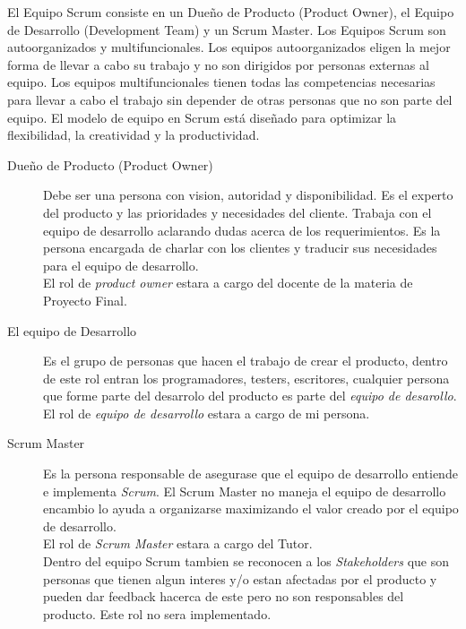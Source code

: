   El Equipo Scrum consiste en un Dueño de Producto (Product Owner), el Equipo de Desarrollo       (Development Team) y un Scrum Master. Los Equipos Scrum son autoorganizados y      multifuncionales. Los equipos autoorganizados eligen la mejor forma de llevar a cabo su trabajo y no son dirigidos por personas externas al equipo. Los equipos multifuncionales tienen todas las competencias necesarias para llevar a cabo el trabajo sin depender de otras personas que no son parte del equipo. El modelo de equipo en Scrum está diseñado para optimizar la flexibilidad, la creatividad y la productividad.

  \begin{description}
    \item[Due\~no de Producto (Product Owner)] Debe ser una persona con vision, autoridad y disponibilidad. Es el experto del producto y las prioridades y necesidades del cliente. Trabaja con el equipo de desarrollo aclarando dudas acerca de los requerimientos. Es la persona encargada de charlar con los clientes y traducir sus necesidades para el equipo de desarrollo.\\
    El rol de \emph{product owner} estara a cargo del docente de la materia de Proyecto Final.

    \item[El equipo de Desarrollo] Es el grupo de personas que hacen el trabajo de crear el producto, dentro de este rol entran los programadores, testers, escritores, cualquier persona que forme parte del desarrolo del producto es parte del \emph{equipo de desarollo}.\\
    El rol de \emph{equipo de desarrollo} estara a cargo de mi persona.

    \item[Scrum Master] Es la persona responsable de asegurase que el equipo de desarrollo entiende e implementa \emph{Scrum}. El Scrum Master no maneja el equipo de desarrollo encambio lo ayuda a organizarse maximizando el valor creado por el equipo de desarrollo.\\
    El rol de \emph{Scrum Master} estara a cargo del Tutor.\\

    Dentro del equipo Scrum tambien se reconocen a los \emph{Stakeholders} que son personas que tienen algun interes y/o estan afectadas por el producto y pueden dar feedback hacerca de este pero no son responsables del producto. Este rol no sera implementado.

  \end{description}

